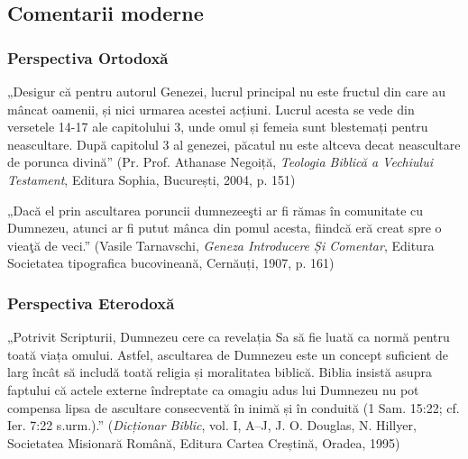 \subsection{Comentarii moderne}

\subsubsection{Perspectiva Ortodoxă}
\begin{displayquote}
    „Desigur că pentru autorul Genezei, lucrul principal nu este fructul din care au mâncat oamenii, și nici urmarea acestei acțiuni.
    Lucrul acesta se vede din versetele 14-17 ale capitolului 3, unde omul
    și femeia sunt blestemați pentru neascultare. După  capitolul 3 al
    genezei, păcatul nu este altceva decat neascultare de porunca divină”
    (Pr. Prof. Athanase Negoiță,
    \textit{Teologia Biblică a Vechiului Testament},
    Editura Sophia,
    București, 2004, p. 151)
\end{displayquote}

\begin{displayquote}
    „Dacă el prin ascultarea poruncii dumnezeeşti ar fi rămas în comunitate
    cu Dumnezeu, atunci ar fi putut mânca din pomul acesta, fiindcă eră creat
    spre o vieaţă de veci.”
    (Vasile Tarnavschi, \emph{Geneza
        Introducere Și Comentar}, Editura Societatea tipografica bucovineană,
    Cernăuți, 1907, p. 161)
\end{displayquote}

\subsubsection{Perspectiva Eterodoxă}

\begin{displayquote}
    „Potrivit Scripturii, Dumnezeu cere ca revelația Sa
    să fie luată ca normă pentru toată viața omului. Astfel,
    ascultarea de Dumnezeu este un concept suficient de
    larg încât să includă toată religia și moralitatea biblică.
    Biblia insistă asupra faptului că actele externe îndreptate
    ca omagiu adus lui Dumnezeu nu pot compensa lipsa
    de ascultare consecventă în inimă și în conduită
    (1 Sam. 15:22; cf. Ier. 7:22 s.urm.).”
    (\textit{Dicționar Biblic}, vol. I, A--J,
    J. O. Douglas, N. Hillyer,
    Societatea Misionară Română, Editura Cartea Creștină,
    Oradea, 1995)
\end{displayquote}

